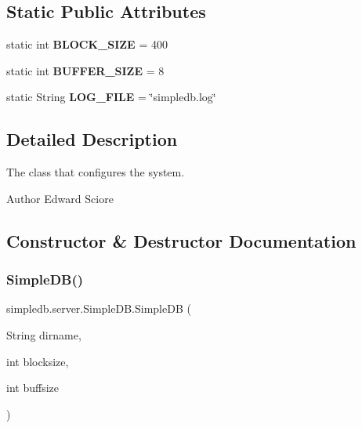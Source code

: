 \subsection*{Static Public Attributes}
\begin{DoxyCompactItemize}
\item 
\mbox{\label{classsimpledb_1_1server_1_1SimpleDB_a79e5658878b00f425f50b89f03800a87}} 
static int {\bfseries B\+L\+O\+C\+K\+\_\+\+S\+I\+ZE} = 400
\item 
\mbox{\label{classsimpledb_1_1server_1_1SimpleDB_af91381c9704595ed36037c40db41877d}} 
static int {\bfseries B\+U\+F\+F\+E\+R\+\_\+\+S\+I\+ZE} = 8
\item 
\mbox{\label{classsimpledb_1_1server_1_1SimpleDB_a440f9b1598f798b54e6b9afefdea8416}} 
static String {\bfseries L\+O\+G\+\_\+\+F\+I\+LE} = \char`\"{}simpledb.\+log\char`\"{}
\end{DoxyCompactItemize}


\subsection{Detailed Description}
The class that configures the system.

\begin{DoxyAuthor}{Author}
Edward Sciore 
\end{DoxyAuthor}


\subsection{Constructor \& Destructor Documentation}
\mbox{\label{classsimpledb_1_1server_1_1SimpleDB_a29c01cb395522b7c79e005122e504195}} 
\subsubsection{\texorpdfstring{Simple\+D\+B()}{SimpleDB()}\hspace{0.1cm}{\footnotesize\ttfamily [1/2]}}
{\footnotesize\ttfamily simpledb.\+server.\+Simple\+D\+B.\+Simple\+DB (\begin{DoxyParamCaption}\item[{String}]{dirname,  }\item[{int}]{blocksize,  }\item[{int}]{buffsize }\end{DoxyParamCaption})\hspace{0.3cm}{\ttfamily [inline]}}

